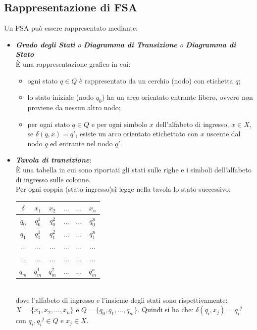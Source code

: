 \documentclass[12pt]{report}
\begin{document}
	\subsection{Rappresentazione di FSA}
	Un FSA può essere rappresentato mediante:
	\begin{itemize}
		\item \textit{\textbf{Grado degli Stati} o \textbf{Diagramma di Transizione} o \textbf{Diagramma di Stato}} \\
		È una rappresentazione grafica in cui:
		\begin{itemize}
			\item ogni stato $q \in Q$ è rappresentato da un cerchio (nodo) con etichetta $q$;
			\item lo stato iniziale (nodo $q_0$) ha un arco orientato entrante libero, ovvero non proviene da nessun altro nodo;
			\item per ogni stato $q \in Q$ e per ogni simbolo $x$ dell'alfabeto di ingresso, $x \in X$, se $\delta(q, x) = q'$, esiste un arco orientato etichettato con $x$ uscente dal nodo $q$ ed entrante nel nodo $q'$.
			\begin{center}

			\end{center}
		\end{itemize}
		\item \textbf{\textit{Tavola di transizione}}: \\
		È una tabella in cui sono riportati gli stati sulle righe e i simboli dell'alfabeto di ingresso sulle colonne. \\
		Per ogni coppia (stato-ingresso)si legge nella tavola lo stato successivo:
		\begin{tabular}{c|ccccc}
			$\delta$ & $x_1$ & $x_2$ & $\ldots$ & $\ldots$ & $x_n$ \\
			\hline
			$q_0$ & $q_0^1$ & $q_0^2$ & $\ldots$ & $\ldots$ & $q_0^n$ \\
			$q_1$ & $q_1^1$ & $q_1^2$ & $\ldots$ & $\ldots$ & $q_1^n$ \\
			$\ldots$ & $\ldots$ & $\ldots$ & $\ldots$ & $\ldots$ & $\ldots$ \\
			$\ldots$ & $\ldots$ & $\ldots$ & $\ldots$ & $\ldots$ & $\ldots$ \\
			$q_m$ & $q_m^1$ & $q_m^2$ & $\ldots$ & $\ldots$ & $q_m^n$ \\
		\end{tabular} \\
		dove l'alfabeto di ingresso e l'insieme degli stati sono rispettivamente: $X = \{x_1, x_2, \dots, x_n\}$ e $Q = \{q_0, q_1, \dots, q_m\}$. Quindi si ha che: $\delta(q_i, x_j) = {q_i}^j$ con $q_i, {q_i}^j \in Q$ e $x_j \in X$.
	\end{itemize}
\end{document}
